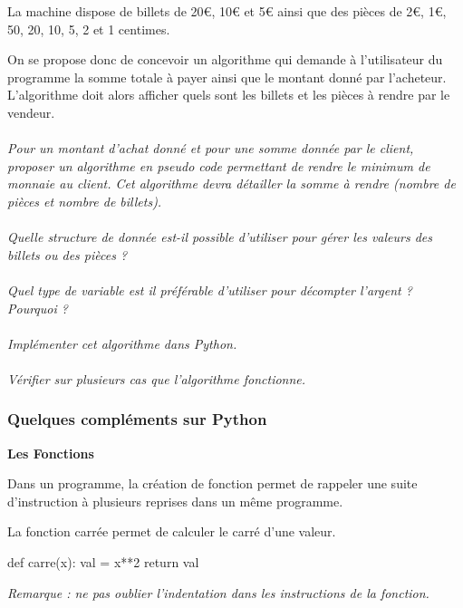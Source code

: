 \documentclass[11pt,oneside]{article}
\begin{document}
\setcounter{paragraph}{0}

La machine dispose de billets de 20€, 10€ et 5€ ainsi que des pièces de 2€, 1€, 50, 20, 10, 5, 2 et 1 centimes. 

On se propose donc de concevoir un algorithme qui demande à l'utilisateur du programme la somme totale à payer ainsi que le montant donné par l'acheteur. L'algorithme doit alors afficher quels sont les billets et les pièces à rendre par le vendeur. 


\paragraph{}
\textit{Pour un montant d'achat donné et pour une somme donnée par le client, proposer un algorithme en pseudo code permettant de rendre le minimum de monnaie au client. Cet algorithme devra détailler la somme à rendre (nombre de pièces et nombre de billets).}

\paragraph{}
\textit{Quelle structure de donnée est-il possible d'utiliser pour gérer les valeurs des billets ou des pièces ?}

\paragraph{}
\textit{Quel type de variable est il préférable d'utiliser pour décompter l'argent ? Pourquoi ?}

\paragraph{}
\textit{Implémenter cet algorithme dans Python.}

\paragraph{}
\textit{Vérifier sur plusieurs cas que l'algorithme fonctionne.}


\subsubsection*{Quelques compléments sur Python}


\begin{py}
\textbf{Les Fonctions}

Dans un programme, la création de fonction permet de rappeler une suite d'instruction à plusieurs reprises dans un même programme.

La fonction carrée permet de calculer le carré d'une valeur. 

\begin{python}
def  carre(x):
    val = x**2
    return val
\end{python}

\textit{Remarque : ne pas oublier l'indentation dans les instructions de la fonction.}
\end{py}
\end{document}
